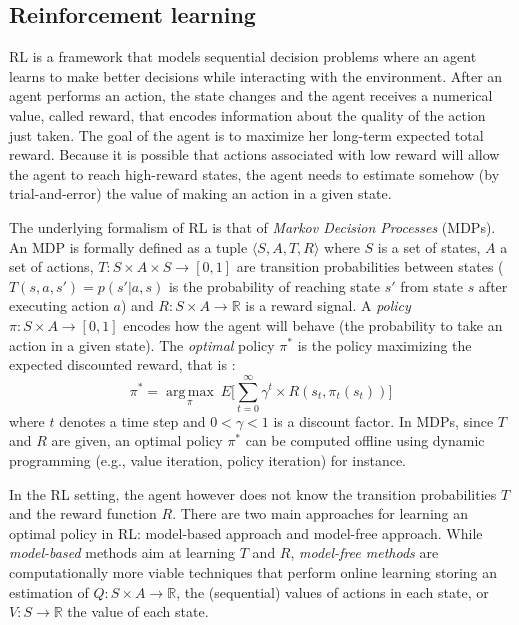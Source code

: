 \subsection{Reinforcement learning}

RL is a framework that models sequential decision
problems where an agent learns to make better decisions while interacting with
the environment. After an agent performs an action, the state changes and the
agent receives a numerical value, called reward, that encodes information
about the quality of the action just taken. The goal of the agent is to maximize
her long-term expected total reward. Because it is possible that actions associated 
with low reward will allow the agent to reach high-reward states, the agent
needs to estimate somehow (by trial-and-error) the value of making an action in
a given state.

The underlying formalism of RL is that of {\em Markov Decision Processes} (MDPs).
An MDP is formally defined as a tuple $\langle S, A, T, R \rangle$ where $S$ is a set of states, $A$ a set of actions, $T : S \times A \times S \rightarrow [0, 1]$ 
are transition probabilities between states
($T(s,a,s')=p(s'|a,s)$ is the probability of reaching state $s'$ from state $s$ after executing action $a$) and 
$R : S \times A \rightarrow \mathbb{R}$ is a reward signal. A \textit{policy} $\pi : S \times A \rightarrow [0, 1]$ encodes how the agent will behave (the probability
to take an action in a given state).
The {\em optimal} policy $\pi^*$ is the policy maximizing the expected discounted reward, that is :
\begin{equation}
\pi^* = \underset{\pi}{\operatorname{arg\,max}}\ E \Big[ \sum\limits_{t=0}^{\infty} \gamma^t \times R(s_t, \pi_t(s_t)) \Big]
\end{equation}
where $t$ denotes a time step and $0 < \gamma < 1$ is a discount factor.
In MDPs, since $T$ and $R$ are given, an optimal policy $\pi^*$ can be computed offline using dynamic programming (e.g., value iteration, policy                                                                  
iteration) \cite{Howard1960} for instance.

In the RL setting, the agent however does not know the transition probabilities $T$ and the reward function $R$.
There are two main approaches for learning an optimal policy in RL: model-based approach and model-free approach.
While {\em model-based} methods aim at learning $T$ and $R$,
{\em model-free methods} are computationally more viable techniques
that perform online learning storing an estimation of $Q : S \times A \rightarrow \mathbb{R}$, the (sequential) values of actions in each state,
or $V : S \rightarrow \mathbb{R}$ the value of each state.

